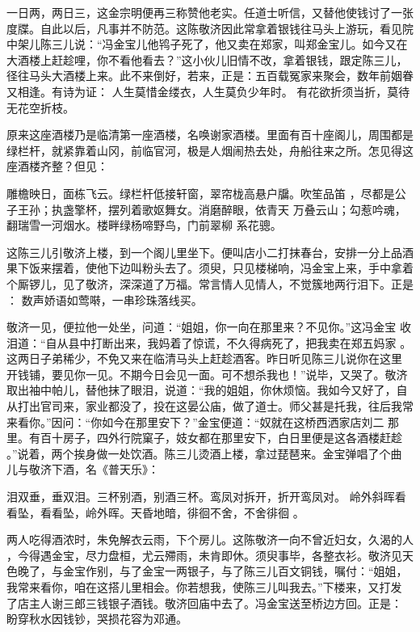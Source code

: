 一日两，两日三，这金宗明便再三称赞他老实。任道士听信，又替他使钱讨了一张
度牒。自此以后，凡事并不防范。这陈敬济因此常拿着银钱往马头上游玩，看见院
中架儿陈三儿说：“冯金宝儿他鸨子死了，他又卖在郑家，叫郑金宝儿。如今又在
大酒楼上赶趁哩，你不看他看去？”这小伙儿旧情不改，拿着银钱，跟定陈三儿，
径往马头大酒楼上来。此不来倒好，若来，正是：五百载冤家来聚会，数年前姻眷
又相逢。有诗为证：
人生莫惜金缕衣，人生莫负少年时。
有花欲折须当折，莫待无花空折枝。

原来这座酒楼乃是临清第一座酒楼，名唤谢家酒楼。里面有百十座阁儿，周围都是
绿栏杆，就紧靠着山冈，前临官河，极是人烟闹热去处，舟船往来之所。怎见得这
座酒楼齐整？但见：

雕檐映日，面栋飞云。绿栏杆低接轩窗，翠帘栊高悬户牖。吹笙品笛
，尽都是公子王孙；执盏擎杯，摆列着歌妪舞女。消磨醉眼，依青天
万叠云山；勾惹吟魂，翻瑞雪一河烟水。楼畔绿杨啼野鸟，门前翠柳
系花骢。

这陈三儿引敬济上楼，到一个阁儿里坐下。便叫店小二打抹春台，安排一分上品酒
果下饭来摆着，使他下边叫粉头去了。须臾，只见楼梯响，冯金宝上来，手中拿着
个厮锣儿，见了敬济，深深道了万福。常言情人见情人，不觉簇地两行泪下。正是
：
数声娇语如莺啭，一串珍珠落线买。

敬济一见，便拉他一处坐，问道：“姐姐，你一向在那里来？不见你。”这冯金宝
收泪道：“自从县中打断出来，我妈着了惊谎，不久得病死了，把我卖在郑五妈家
。这两日子弟稀少，不免又来在临清马头上赶趁酒客。昨日听见陈三儿说你在这里
开钱铺，要见你一见。不期今日会见一面。可不想杀我也！”说毕，又哭了。敬济
取出袖中帕儿，替他抹了眼泪，说道：“我的姐姐，你休烦恼。我如今又好了，自
从打出官司来，家业都没了，投在这晏公庙，做了道士。师父甚是托我，往后我常
来看你。”因问：“你如今在那里安下？”金宝便道：“奴就在这桥西洒家店刘二
那里。有百十房子，四外行院窠子，妓女都在那里安下，白日里便是这各酒楼赶趁
。”说着，两个挨身做一处饮酒。陈三儿烫酒上楼，拿过琵琶来。金宝弹唱了个曲
儿与敬济下酒，名《普天乐》：

泪双垂，垂双泪。三杯别酒，别酒三杯。鸾凤对拆开，折开鸾凤对。
岭外斜晖看看坠，看看坠，岭外晖。天昏地暗，徘徊不舍，不舍徘徊
。

两人吃得酒浓时，朱免解衣云雨，下个房儿。这陈敬济一向不曾近妇女，久渴的人
，今得遇金宝，尽力盘桓，尤云殢雨，未肯即休。须臾事毕，各整衣衫。敬济见天
色晚了，与金宝作别，与了金宝一两银子，与了陈三儿百文铜钱，嘱付：“姐姐，
我常来看你，咱在这搭儿里相会。你若想我，使陈三儿叫我去。”下楼来，又打发
了店主人谢三郎三钱银子酒钱。敬济回庙中去了。冯金宝送至桥边方回。正是：
盼穿秋水因钱钞，哭损花容为邓通。